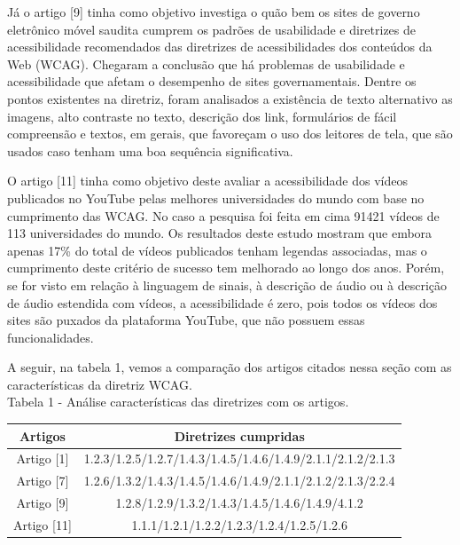 \documentclass[a4paper]{article}
\begin{document}
\begin{titlepage}
Já o artigo [9] tinha como objetivo investiga o quão bem os sites de governo eletrônico móvel saudita cumprem os padrões de usabilidade e diretrizes de acessibilidade recomendados das diretrizes de acessibilidades dos conteúdos da Web (WCAG). Chegaram a conclusão que há problemas de usabilidade e acessibilidade que afetam o desempenho de sites governamentais. Dentre os pontos existentes na diretriz, foram analisados a existência de texto alternativo as imagens, alto contraste no texto, descrição dos link, formulários de fácil compreensão e textos, em gerais, que favoreçam o uso dos leitores de tela, que são usados caso tenham uma boa sequência significativa.

O artigo [11] tinha como objetivo deste avaliar a acessibilidade dos vídeos publicados no YouTube pelas melhores universidades do mundo com base no cumprimento das WCAG. No caso a pesquisa foi feita em cima 91421 vídeos de 113 universidades do mundo. Os resultados deste estudo mostram que embora apenas 17\% do total de vídeos publicados tenham legendas associadas, mas o cumprimento deste critério de sucesso tem melhorado ao longo dos anos. Porém, se for visto em relação à linguagem de sinais, à descrição de áudio ou à descrição de áudio estendida com vídeos, a acessibilidade é zero, pois todos os vídeos dos sites são puxados da plataforma YouTube, que não possuem essas funcionalidades.

A seguir, na tabela 1, vemos a comparação dos artigos citados nessa seção com as características da diretriz WCAG.\\

Tabela 1 - Análise características das diretrizes com os artigos.
\begin{center}
	\begin{tabular}{cc}
		\hline
		Artigos & Diretrizes cumpridas\\
		\hline
		Artigo [1] & 1.2.3/1.2.5/1.2.7/1.4.3/1.4.5/1.4.6/1.4.9/2.1.1/2.1.2/2.1.3\\
		Artigo [7] & 1.2.6/1.3.2/1.4.3/1.4.5/1.4.6/1.4.9/2.1.1/2.1.2/2.1.3/2.2.4\\
		Artigo [9] & 1.2.8/1.2.9/1.3.2/1.4.3/1.4.5/1.4.6/1.4.9/4.1.2\\
		Artigo [11] & 1.1.1/1.2.1/1.2.2/1.2.3/1.2.4/1.2.5/1.2.6\\
		\hline
	\end{tabular}
\end{center}


\end{titlepage}
\end{document}

